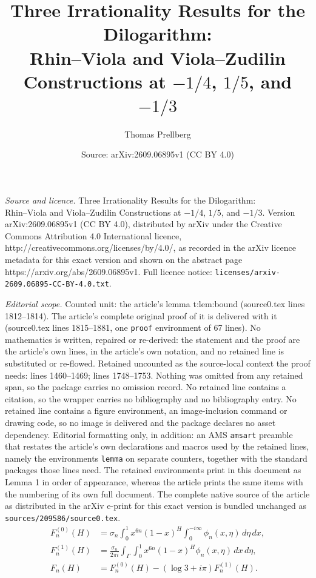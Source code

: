 \documentclass[10pt,a4paper]{amsart}
\title{Three Irrationality Results for the Dilogarithm:\\Rhin--Viola and Viola--Zudilin Constructions at $-1/4$, $1/5$, and $-1/3$}
\author{Thomas Prellberg}
\date{Source: arXiv:2609.06895v1 (CC BY 4.0)}
\newcommand{\dd}{\,d}
\begin{document}
\maketitle

\noindent\emph{Source and licence.} Three Irrationality Results for the Dilogarithm:\\Rhin--Viola and Viola--Zudilin Constructions at $-1/4$, $1/5$, and $-1/3$. Version arXiv:2609.06895v1 (CC BY 4.0), distributed by arXiv under the Creative Commons Attribution 4.0 International licence, http://creativecommons.org/licenses/by/4.0/, as recorded in the arXiv licence metadata for this exact version and shown on the abstract page https://arxiv.org/abs/2609.06895v1. Full licence notice: \texttt{licenses/arxiv-2609.06895-CC-BY-4.0.txt}.\par\smallskip

\noindent\textit{Editorial scope.} Counted unit: the article's lemma t:lem:bound (source0.tex lines 1812--1814). The article's complete original proof of it is delivered with it (source0.tex lines 1815--1881, one \texttt{proof} environment of 67 lines). No mathematics is written, repaired or re-derived: the statement and the proof are the article's own lines, in the article's own notation, and no retained line is substituted or re-flowed.  Retained uncounted as the source-local context the proof needs: lines 1460--1469; lines 1748--1753.  Nothing was omitted from any retained span, so the package carries no omission record.  No retained line contains a citation, so the wrapper carries no bibliography and no bibliography entry.  No retained line contains a figure environment, an image-inclusion command or drawing code, so no image is delivered and the package declares no asset dependency.  Editorial formatting only, in addition: an AMS \texttt{amsart} preamble that restates the article's own declarations and macros used by the retained lines, namely the environments \texttt{lemma} on separate counters, together with the standard packages those lines need.  The retained environments print in this document as Lemma 1 in order of appearance, whereas the article prints the same items with the numbering of its own full document.  The complete native source of the article as distributed in the arXiv e-print for this exact version is bundled unchanged as \texttt{sources/209586/source0.tex}.
\begin{align}
 F_n^{(0)}(H)&=\sigma_n\int_0^1 x^{6n}(1-x)^H
       \int_0^{-i\infty}\phi_n(x,\eta)\dd\eta\dd x,
       \label{t:eq:vertical}\\
 F_n^{(1)}(H)&=\frac{\sigma_n}{2\pi i}\int_\Gamma\int_0^1
       x^{6n}(1-x)^H\phi_n(x,\eta)\dd x\dd\eta,
       \label{t:eq:residue}\\
 F_n(H)&=F_n^{(0)}(H)-(\log3+i\pi)F_n^{(1)}(H).
       \label{t:eq:mixed}
\end{align}
\end{document}

